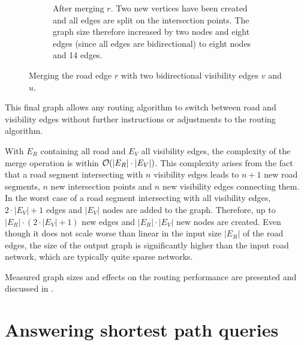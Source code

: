 \begin{figure}[h]
\begin{figcenter}
\begin{subfigure}[t]{.48\textwidth}
\begin{figcenter}
					\end{figcenter}
					\caption{
						After merging $r$. Two new vertices have been created and all edges are split on the intersection points. The graph size therefore increased by two nodes and eight edges (since all edges are bidirectional) to eight nodes and 14 edges.
					}
					\label{fig:merging-edges-b}
				\end{subfigure}
			\end{figcenter}
			\caption{
				Merging the road edge $r$ with two bidirectional visibility edges $v$ and $u$.
			}
			\label{fig:merging-edges}
		\end{figure}
	
		This final graph allows any routing algorithm to switch between road and visibility edges without further instructions or adjustments to the routing algorithm.
		

		With $E_R$ containing all road and $E_V$ all visibility edges, the complexity of the merge operation is within $\mathcal{O}(|E_R| \cdot |E_V|)$.
		This complexity arises from the fact that a road segment intersecting with $n$ visibility edges leads to $n+1$ new road segments, $n$ new intersection points and $n$ new visibility edges connecting them.
		In the worst case of a road segment intersecting with all visibility edges, $2 \cdot |E_V| + 1$ edges and $|E_V|$ nodes are added to the graph.
		Therefore, up to $|E_R| \cdot (2 \cdot |E_V| + 1)$ new edges and $|E_R| \cdot |E_V|$ new nodes are created.
		Even though it does not scale worse than linear in the input size $|E_R|$ of the road edges, the size of the output graph is significantly higher than the input road network, which are typically quite sparse networks.

		Measured graph sizes and effects on the routing performance are presented and discussed in .
	
\section{Answering shortest path queries}
\label{sec:answering-queries}

